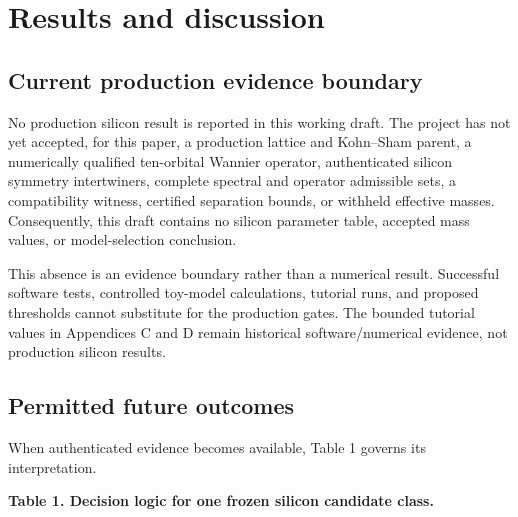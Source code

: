 \documentclass[11pt]{article}
\newenvironment{prospective}{\color{prospectivered}}{}
\begin{document}
\begin{prospective}
\section{Results and discussion}
\subsection{Current production evidence boundary}
No production silicon result is reported in this working draft. The project has not yet accepted, for this paper, a production lattice and Kohn–Sham parent, a numerically qualified ten-orbital Wannier operator, authenticated silicon symmetry intertwiners, complete spectral and operator admissible sets, a compatibility witness, certified separation bounds, or withheld effective masses. Consequently, this draft contains no silicon parameter table, accepted mass values, or model-selection conclusion.

This absence is an evidence boundary rather than a numerical result. Successful software tests, controlled toy-model calculations, tutorial runs, and proposed thresholds cannot substitute for the production gates. The bounded tutorial values in Appendices C and D remain historical software/numerical evidence, not production silicon results.

\subsection{Permitted future outcomes}
When authenticated evidence becomes available, Table 1 governs its interpretation.

\textbf{Table 1. Decision logic for one frozen silicon candidate class.}


\end{prospective}
\end{document}
